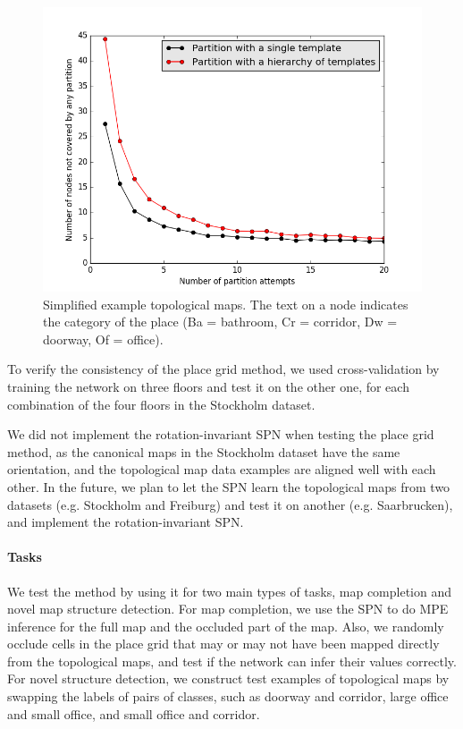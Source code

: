 \documentclass[10pt, titlepage]{article}
\theoremstyle{definition}
\begin{document}
\begin{figure}[!htb]
    \centering
    \captionsetup{width=.8\linewidth}
    \includegraphics[scale=0.7]{images/partition_loss.png}
    \caption{Simplified example topological maps. The text on a node indicates the category of the place (Ba = bathroom, Cr = corridor, Dw = doorway, Of = office).}
    \label{fig:topomap}
\end{figure}


To verify the consistency of the place grid method,  we used cross-validation by training the network on three floors and test it on the other one, for each combination of the four floors in the Stockholm dataset.

We did not implement the rotation-invariant SPN when testing the place grid method, as the canonical maps in the Stockholm dataset have the same orientation, and the topological map data examples are aligned well with each other. In the future, we plan to let the SPN learn the topological maps from two datasets (e.g. Stockholm and Freiburg) and test it on another (e.g. Saarbrucken), and implement the rotation-invariant SPN.

\paragraph{Tasks} We test the method by using it for two main types of tasks, map completion and novel map structure detection. For map completion, we use the SPN to do MPE inference for the full map and the occluded part of the map. Also, we randomly occlude cells in the place grid that may or may not have been mapped directly from the topological maps, and test if the network can infer their values correctly. For novel structure detection, we construct test examples of topological maps by swapping the labels of pairs of classes, such as doorway and corridor, large office and small office, and small office and corridor.
\end{document}
